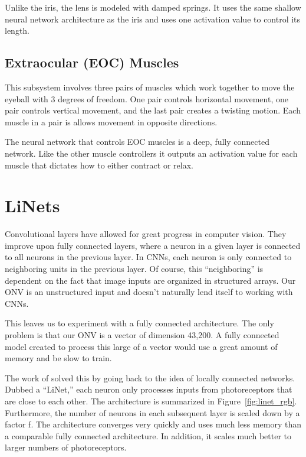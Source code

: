 \documentclass [MS] {UCLAthesis}
\begin{document}
Unlike the iris, the lens is modeled with damped springs. It uses the same shallow neural network architecture as the iris and uses one activation value to control its length.


\section{Extraocular (EOC) Muscles}

This subsystem involves three pairs of muscles which work together to move the eyeball with 3 degrees of freedom. One pair controls horizontal movement, one pair controls vertical movement, and the last pair creates a twisting motion. Each muscle in a pair is allows movement in opposite directions.  

The neural network that controls EOC muscles is a deep, fully connected network. Like the other muscle controllers it outputs an activation value for each muscle that dictates how to either contract or relax.


\chapter{LiNets}
\label{appendix:linet}


Convolutional layers have allowed for great progress in computer vision. They improve upon fully
connected layers, where a neuron in a given layer is connected to all neurons in the previous layer. In CNNs, each neuron is only connected to neighboring units in the previous layer. Of course, this ``neighboring'' is dependent on the fact that image inputs are organized in structured arrays. Our ONV is an unstructured input and doesn't naturally lend itself to working with CNNs.

This leaves us to experiment with a fully connected architecture. The only problem is that our ONV is a vector of dimension 43,200. A fully connected model created to process this large of a vector would use a great amount of memory and be slow to train. 

The work of \citet{Masaki} solved this by going back to the idea of locally connected networks. Dubbed a ``LiNet,'' each neuron only processes inputs from photoreceptors that are close to each other. The architecture is summarized in Figure~\ref{fig:linet_rgb}. Furthermore, the number of neurons in each subsequent layer is scaled down by a factor f. The architecture converges very quickly and uses much less memory than a comparable fully connected architecture. In addition, it scales much better to larger numbers of photoreceptors.
\end{document}
